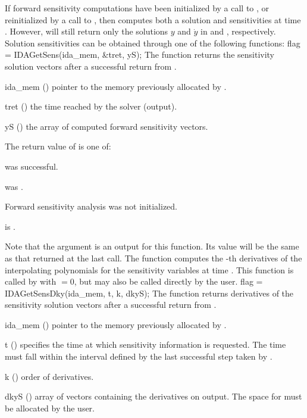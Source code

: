 If forward sensitivity computations have been initialized by a call to
, or reinitialized by a call to ,
then {\idas} computes both a solution and sensitivities at time
. However,  will still return only the solutions
$y$ and $\dot{y}$ in  and , respectively.  Solution
sensitivities can be obtained through one of the following functions:
{
  flag = IDAGetSens(ida\_mem, \&tret, yS);
}
{
  The function  returns the sensitivity solution vectors after a
  successful return from .
}
{
  \begin{args}
  \item[ida\_mem] ()
    pointer to the memory previously allocated by .
  \item[tret] ()
    the time reached by the solver (output).
  \item[yS] ()
    the array of  computed forward sensitivity vectors.
  \end{args}
}
{
  The return value  of  is one of:
  \begin{args}
  \item[\Id{IDA\_SUCCESS}] 
     was successful.
  \item[\Id{IDA\_MEM\_NULL}] 
     was .
  \item[\Id{IDA\_NO\_SENS}] 
    Forward sensitivity analysis was not initialized.
  \item[\Id{IDA\_BAD\_DKY}] 
     is .
  \end{args}
}
{
  Note that the argument  is an output for this function. Its value will be
  the same as that returned at the last  call.
}
The function  computes the -th derivatives of the interpolating 
polynomials for the sensitivity variables at time .
This function is called by  with  $= 0$, but may also be called 
directly by the user.
{
  flag = IDAGetSensDky(ida\_mem, t, k, dkyS);
}
{
  The function  returns derivatives of the sensitivity solution 
  vectors after a successful return from .
}
{
  \begin{args}
  \item[ida\_mem] ()
    pointer to the memory previously allocated by .
  \item[t] ()
    specifies the time at which sensitivity information is 
    requested. The time  must fall within the interval defined by the last 
    successful step taken by {\idas}.
  \item[k] () order of derivatives.
  \item[dkyS] ()
    array of  vectors containing the derivatives on output. The space for
     must be allocated by the user. 
  \end{args}
}
